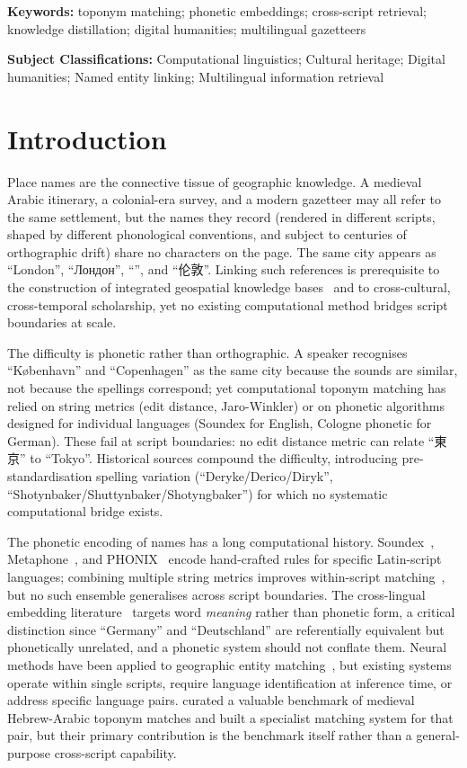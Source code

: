 \documentclass[11pt,a4paper]{article}
\newcommand{\textar}[1]{{\arabicfont\RL{#1}}}
\newcommand{\textcn}[1]{{\chinesefont #1}}
\begin{document}
\textbf{Keywords:} toponym matching; phonetic embeddings; cross-script retrieval; knowledge distillation; digital humanities; multilingual gazetteers

\noindent\textbf{Subject Classifications:} Computational linguistics; Cultural heritage; Digital humanities; Named entity linking; Multilingual information retrieval


\section{Introduction}
\label{sec:introduction}

Place names are the connective tissue of geographic knowledge. A medieval Arabic itinerary, a colonial-era survey, and a modern gazetteer may all refer to the same settlement, but the names they record (rendered in different scripts, shaped by different phonological conventions, and subject to centuries of orthographic drift) share no characters on the page. The same city appears as ``London'', ``Лондон'', ``\textar{لندن}'', and ``\textcn{伦敦}''. Linking such references is prerequisite to the construction of integrated geospatial knowledge bases~\citep{hill2006georeferencing} and to cross-cultural, cross-temporal scholarship, yet no existing computational method bridges script boundaries at scale.

The difficulty is phonetic rather than orthographic. A speaker recognises ``København'' and ``Copenhagen'' as the same city because the sounds are similar, not because the spellings correspond; yet computational toponym matching has relied on string metrics (edit distance, Jaro-Winkler) or on phonetic algorithms designed for individual languages (Soundex for English, Cologne phonetic for German). These fail at script boundaries: no edit distance metric can relate ``\textcn{東京}'' to ``Tokyo''. Historical sources compound the difficulty, introducing pre-standardisation spelling variation (``Deryke/Derico/Diryk'', ``Shotynbaker/Shuttynbaker/Shotyngbaker'') for which no systematic computational bridge exists.

The phonetic encoding of names has a long computational history. Soundex~\citep{odell1918}, Metaphone~\citep{philips1990}, and PHONIX~\citep{gadd1990phonix} encode hand-crafted rules for specific Latin-script languages; combining multiple string metrics improves within-script matching~\citep{recchia2013,santos2018}, but no such ensemble generalises across script boundaries. The cross-lingual embedding literature~\citep{conneau2018,artetxe2018} targets word \emph{meaning} rather than phonetic form, a critical distinction since ``Germany'' and ``Deutschland'' are referentially equivalent but phonetically unrelated, and a phonetic system should not conflate them. Neural methods have been applied to geographic entity matching~\citep{qiu2024geobert,rama2016,mehdie2025}, but existing systems operate within single scripts, require language identification at inference time, or address specific language pairs. \citet{mehdie2025} curated a valuable benchmark of medieval Hebrew-Arabic toponym matches and built a specialist matching system for that pair, but their primary contribution is the benchmark itself rather than a general-purpose cross-script capability.
\end{document}
